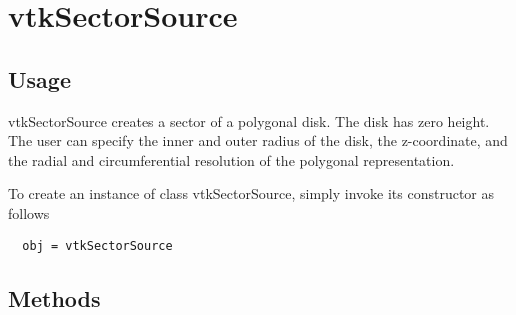 \section{vtkSectorSource}

\subsection{Usage}

 vtkSectorSource creates a sector of a polygonal disk. The 
 disk has zero height. The user can specify the inner and outer radius
 of the disk, the z-coordinate, and the radial and 
 circumferential resolution of the polygonal representation. 

To create an instance of class vtkSectorSource, simply
invoke its constructor as follows
\begin{verbatim}
  obj = vtkSectorSource
\end{verbatim}
\subsection{Methods}

